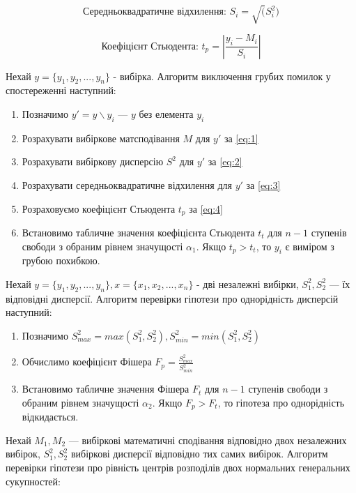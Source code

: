 \documentclass{dstu}
\begin{document}
\begin{equation}
	\label{eq:3}
	\text{Середньоквадратичне відхилення: }
	S_i = \sqrt(S_i^2)
\end{equation}

\begin{equation}
	\label{eq:4}
	\text{Коефіцієнт Стьюдента: }
	t_p = |{\frac{y_i - M_i}{S_i}}|
\end{equation}

Нехай $y = \lbrace{y_1, y_2, ..., y_n}\rbrace$ - вибірка.
Алгоритм виключення грубих помилок у спостереженні наступний:

\begin{enumerate}
	\item Позначимо $y'=y \backslash y_i$ — $y$ без елемента $y_i$
	\item Розрахувати вибіркове матсподівання $M$ для $y'$ за \ref{eq:1}
	\item Розрахувати вибіркову дисперсію $S^2$ для $y'$ за \ref{eq:2}
	\item Розрахувати середньоквадратичне відхилення для $y'$ за \ref{eq:3}
	\item Розраховуємо коефіцієнт Стьюдента $t_p$ за \ref{eq:4}
	\item Встановимо табличне значення коефіцієнта Стьюдента $t_t$ для $n-1$ ступенів свободи з обраним рівнем значущості $\alpha_1$.
	Якщо $t_p > t_t$, то $y_i$ є виміром з грубою похибкою.
\end{enumerate}

Нехай $y = \lbrace{y_1, y_2, ..., y_n}\rbrace, x = \lbrace{x_1, x_2, ..., x_n}\rbrace$ - дві незалежні вибірки,
$S^2_1, S^2_2$ — їх відповідні дисперсії.
Алгоритм перевірки гіпотези про однорідність дисперсій наступний:

\begin{enumerate}
	\item Позначимо $S^2_{max} = max(S^2_1, S^2_2), S^2_{min} = min(S^2_1, S^2_2)$
	\item Обчислимо коефіцієнт Фішера $F_p = \frac{S^2_{max}}{S^2_{min}}$
	\item Встановимо табличне значення Фішера $F_t$ для $n-1$ ступенів свободи з обраним рівнем значущості $\alpha_2$.
	Якщо $F_p > F_t$, то гіпотеза про однорідність відкидається.
\end{enumerate}

Нехай $M_1, M_2$ — вибіркові математичні сподівання відповідно двох незалежних вибірок,
$S^2_1, S^2_2$ вибіркові дисперсії відповідно тих самих вибірок.
Алгоритм перевірки гіпотези про рівність центрів розподілів двох 
нормальних генеральних сукупностей:
\end{document}
